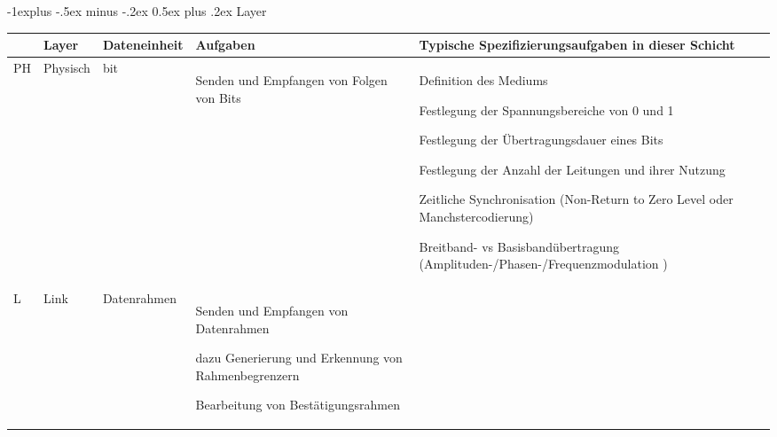 \documentclass[10pt,landscape]{article}
\makeatletter
\renewcommand{\subsection}{\@startsection{subsection}{2}{0mm}%
                                {-1explus -.5ex minus -.2ex}%
                                {0.5ex plus .2ex}%
                                {\normalfont\normalsize\bfseries}}
\makeatother
\begin{document}
\subsection{Layer}
\begin{tabular}{ l | l | l | p{6cm} | p{10cm} }
       & \textbf{Layer} & \textbf{Dateneinheit}                  & \textbf{Aufgaben}                                 & \textbf{Typische Spezifizierungsaufgaben in dieser Schicht} \\\hline
    PH & Physisch       & bit                                    & \begin{itemize*}
        \item Senden und Empfangen von Folgen von Bits 
    \end{itemize*}                    & \begin{itemize*}
        \item Definition des Mediums
        \item Festlegung der Spannungsbereiche von 0 und 1
        \item Festlegung der Übertragungsdauer eines Bits
        \item Festlegung der Anzahl der Leitungen und ihrer Nutzung
        \item Zeitliche Synchronisation (Non-Return to Zero Level oder Manchstercodierung)
        \item Breitband- vs Basisbandübertragung (Amplituden-/Phasen-/Frequenzmodulation ) %
    \end{itemize*}                              \\\hline
    L  & Link           & Datenrahmen                            & \begin{itemize*}
        \item Senden und Empfangen von Datenrahmen
        \item dazu Generierung und Erkennung von Rahmenbegrenzern
        \item Bearbeitung von Bestätigungsrahmen

\end{itemize*}
\end{tabular}
\end{document}
